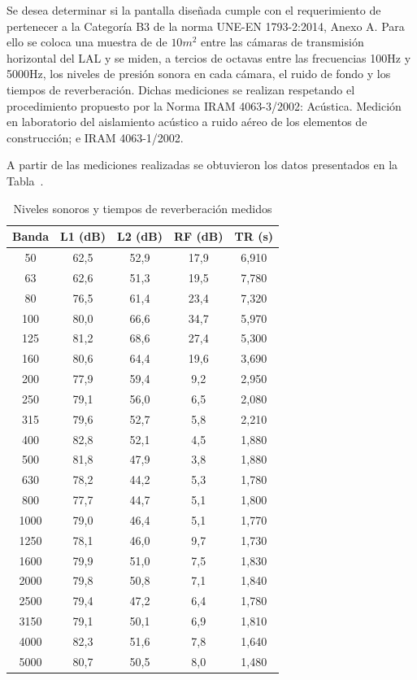 \par Se desea determinar si la pantalla diseñada cumple con el requerimiento de pertenecer a la Categoría B3 de la norma UNE-EN 1793-2:2014, Anexo A. Para ello se coloca una muestra de de $10 m^2$ entre las cámaras de transmisión horizontal del LAL y se miden, a tercios de octavas entre las frecuencias  100Hz y 5000Hz, los niveles de presión sonora en cada cámara, el ruido de fondo y los tiempos de reverberación. Dichas mediciones se realizan respetando el procedimiento propuesto por la Norma IRAM 4063-3/2002: Acústica. Medición en laboratorio del aislamiento acústico a ruido aéreo de los elementos de construcción; e IRAM 4063-1/2002.

\par A partir de las mediciones realizadas se obtuvieron los datos presentados en la Tabla~.

\begin{table}[H]
    \centering
    \begin{tabular}{|c|c|c|c|c|} \hline
        \textbf{Banda} & \textbf{L1 (dB)} & \textbf{L2 (dB)} & \textbf{RF (dB)} & \textbf{TR (s)} \\ \hline \hline
        50& 62,5&	52,9&	17,9&	6,910 \\ \hline
        63& 62,6&	51,3&	19,5&	7,780 \\ \hline
        80& 76,5&	61,4&	23,4&	7,320 \\ \hline
        100& 80,0&	66,6&	34,7&	5,970 \\ \hline
        125& 81,2&  68,6&	27,4&	5,300 \\ \hline
        160& 80,6&	64,4&	19,6&	3,690\\ \hline
        200& 77,9&	59,4&	9,2 &	2,950 \\ \hline
        250& 79,1&	56,0&	6,5 &	2,080\\ \hline
        315& 79,6&	52,7&	5,8 &	2,210 \\ \hline
        400& 82,8&	52,1&	4,5 &	1,880 \\ \hline
        500& 81,8&	47,9&	3,8 &	1,880 \\ \hline
        630& 78,2&	44,2&	5,3 &	1,780 \\ \hline
        800& 77,7&	44,7&	5,1 &	1,800 \\ \hline
        1000& 79,0&	46,4&	5,1 &	1,770 \\ \hline
        1250& 78,1&	46,0&	9,7 &	1,730 \\ \hline
        1600& 79,9&	51,0&	7,5 &	1,830 \\ \hline
        2000& 79,8&	50,8&	7,1 &	1,840 \\ \hline
        2500& 79,4&	47,2&	6,4 &	1,780 \\ \hline
        3150& 79,1&	50,1&	6,9 &	1,810 \\ \hline
        4000& 82,3&	51,6&	7,8 &	1,640 \\ \hline
        5000& 80,7&	50,5&	8,0 &	1,480\\ \hline
    \end{tabular}
    \caption{Niveles sonoros y tiempos de reverberación medidos}
    \label{tab:Niveles_sonoros_y_tiempos_de_reverberacion_medidos}
\end{table}


